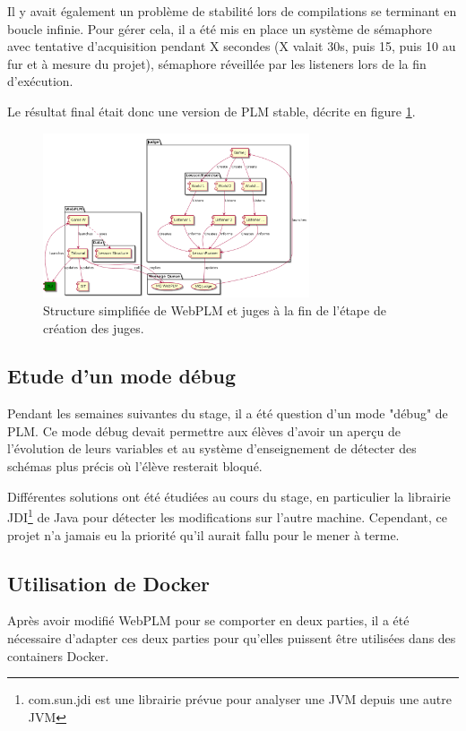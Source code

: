 \documentclass[stage]{tnreport}
\begin{document}
Il y avait également un problème de stabilité lors de compilations se terminant en boucle infinie. Pour gérer cela, il a été mis en place un système de sémaphore avec tentative d'acquisition pendant X secondes (X valait 30s, puis 15, puis 10 au fur et à mesure du projet), sémaphore réveillée par les listeners lors de la fin d'exécution.

Le résultat final était donc une version de PLM stable, décrite en figure \ref{fig:wplmUP2}.
\begin{figure}[h]
	\centering
		\includegraphics[width=0.7\textwidth]{figures/WebPLM-uml-cp2}
	\caption{Structure simplifiée de WebPLM et juges à la fin de l'étape de création des juges.}
	\label{fig:wplmUP2}
\end{figure}

\subsection{Etude d'un mode débug}

Pendant les semaines suivantes du stage, il a été question d'un mode "débug" de PLM. Ce mode débug devait permettre aux élèves d'avoir un aperçu de l'évolution de leurs variables et au système d'enseignement de détecter des schémas plus précis où l'élève resterait bloqué.

Différentes solutions ont été étudiées au cours du stage, en particulier la librairie JDI\footnote{com.sun.jdi est une librairie prévue pour analyser une JVM depuis une autre JVM} de Java pour détecter les modifications sur l'autre machine. Cependant, ce projet n'a jamais eu la priorité qu'il aurait fallu pour le mener à terme.

\subsection{Utilisation de Docker}

Après avoir modifié WebPLM pour se comporter en deux parties, il a été nécessaire d'adapter ces deux parties pour qu'elles puissent être utilisées dans des containers Docker.
\end{document}
